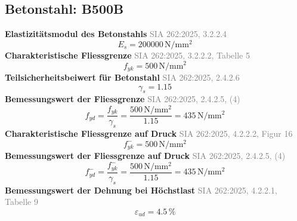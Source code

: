 \documentclass[11pt,a4paper]{article}
\newcommand{\normref}[1]{{\small\textcolor{gray}{#1}}}
\begin{document}
\subsection{Betonstahl: B500B}
\noindent\textbf{Elastizitätsmodul des Betonstahls} \hfill \normref{SIA 262:2025, 3.2.2.4}
\begin{equation*}
E_s = 200000\,\mathrm{N}/\mathrm{mm}^{2}
\end{equation*}
\noindent\textbf{Charakteristische Fliessgrenze} \hfill \normref{SIA 262:2025, 3.2.2.2, Tabelle 5}
\begin{equation*}
f_{yk} = 500\,\mathrm{N}/\mathrm{mm}^{2}
\end{equation*}
\noindent\textbf{Teilsicherheitsbeiwert für Betonstahl} \hfill \normref{SIA 262:2025, 2.4.2.6}
\begin{equation*}
\gamma_s = 1.15
\end{equation*}
\noindent\textbf{Bemessungswert der Fliessgrenze} \hfill \normref{SIA 262:2025, 2.4.2.5, (4)}
\begin{equation*}
f_{yd} = \frac{f_{yk}}{\gamma_s} = \frac{500\,\mathrm{N}/\mathrm{mm}^{2}}{1.15} = 435\,\mathrm{N}/\mathrm{mm}^{2}
\end{equation*}
\noindent\textbf{Charakteristische Fliessgrenze auf Druck} \hfill \normref{SIA 262:2025, 4.2.2.2, Figur 16}
\begin{equation*}
f_{yk}^{-} = 500\,\mathrm{N}/\mathrm{mm}^{2}
\end{equation*}
\noindent\textbf{Bemessungswert der Fliessgrenze auf Druck} \hfill \normref{SIA 262:2025, 2.4.2.5, (4)}
\begin{equation*}
f_{yd}^{-} = \frac{f_{yk}^{-}}{\gamma_s} = \frac{500\,\mathrm{N}/\mathrm{mm}^{2}}{1.15} = 435\,\mathrm{N}/\mathrm{mm}^{2}
\end{equation*}
\noindent\textbf{Bemessungswert der Dehnung bei Höchstlast} \hfill \normref{SIA 262:2025, 4.2.2.1, Tabelle 9}
\begin{equation*}
\varepsilon_{ud} = 4.5\,\%
\end{equation*}
\end{document}
